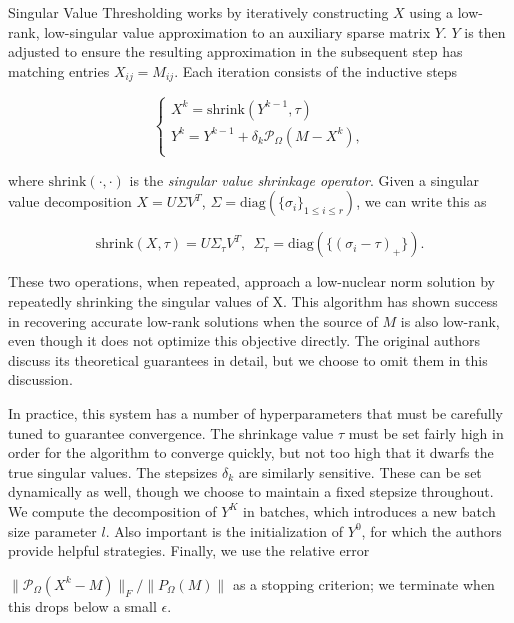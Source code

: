 \documentclass{article} %
\begin{document}
Singular Value Thresholding works by iteratively constructing $X$
using a low-rank, low-singular value approximation to an auxiliary
sparse matrix $Y$. $Y$ is then adjusted to ensure the resulting
approximation in the subsequent step has matching entries
$X_{ij} = M_{ij}$. Each iteration consists of the inductive steps

\begin{equation*}
\begin{cases}
X^{k} = \mathrm{shrink}(Y^{k-1}, \tau) \\
Y^{k} = Y^{k-1} + \delta_k \mathcal{P}_\Omega (M-X^{k}),              \\
\end{cases}
\end{equation*}

where $\mathrm{shrink}(\cdot, \cdot)$ is the \emph{singular value
  shrinkage operator}. Given a singular value decomposition $X = U
\Sigma V^T$, $\Sigma = \mathrm{diag}(\{\sigma_i\}_{1 \le i \le r})$, we
  can write this as

\begin{equation*}
\mathrm{shrink}(X, \tau) = U\Sigma_\tau V^T, \ \ \Sigma_\tau = \mathrm{diag}(\{(\sigma_i-\tau)_{+}\}).
\end{equation*} 

These two operations, when repeated, approach a low-nuclear norm
solution by repeatedly shrinking the singular values of X. This
algorithm has shown success in recovering accurate low-rank solutions
when the source of $M$ is also low-rank, even though it does not
optimize this objective directly. The original authors discuss its
theoretical guarantees in detail, but we choose to omit them in this
discussion.

In practice, this system has a number of hyperparameters that must be
carefully tuned to guarantee convergence. The shrinkage value $\tau$
must be set fairly high in order for the algorithm to converge
quickly, but not too high that it dwarfs the true singular values. The
stepsizes $\delta_k$ are similarly sensitive. These can be set
dynamically as well, though we choose to maintain a fixed stepsize
throughout. We compute the decomposition of $Y^K$ in batches, which
introduces a new batch size parameter $l$. Also important is the
initialization of $Y^0$, for which the authors provide helpful
strategies. Finally, we use the relative error

$\|\mathcal{P}_{\Omega}(X^k-M)\|_F / \|P_{\Omega} (M)\|$ as a stopping
criterion; we terminate when this drops below a small $\epsilon$.
\end{document}
